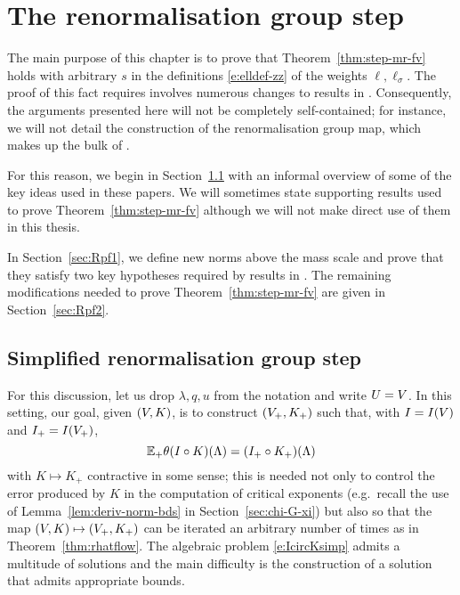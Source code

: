 \chapter{The renormalisation group step}
\label{sec:RGstep}

\renewcommand{\Vpt}{\Vp_\pt}

The main purpose of this chapter is to prove that Theorem~\ref{thm:step-mr-fv}
holds with arbitrary $s$ in the definitions \eqref{e:elldef-zz} of the weights
$\ell, \ell_\sigma$. The proof of this fact requires involves numerous changes
to results in \cite{BS-rg-loc,BS-rg-IE,BS-rg-step}.
Consequently, the arguments presented here will not be completely self-contained;
for instance, we will not detail the construction of the renormalisation group
map, which makes up the bulk of \cite{BS-rg-step}.

For this reason, we begin in Section~\ref{sec:rgmech} with an informal overview
of some of the key ideas used in these papers. We will sometimes state supporting
results used to prove Theorem~\ref{thm:step-mr-fv} although we will not make direct
use of them in this thesis.

In Section~\ref{sec:Rpf1}, we define new norms above the mass scale and  prove
that they satisfy two key hypotheses required by results in \cite{BS-rg-IE}.
The remaining modifications needed to prove Theorem~\ref{thm:step-mr-fv} are
given in Section~\ref{sec:Rpf2}.


\section{Simplified renormalisation group step}
\label{sec:rgmech}

For this discussion, let us drop $\lambda, q, u$ from the notation and write
$U = V$. In this setting, our goal, given $(V, K)$, is to construct
$(V_+, K_+)$ such that, with $I = I(V)$ and $I_+ = I(V_+)$,
\begin{equation}
\label{e:IcircKsimp}
\mathbb{E}_+ \theta (I \circ K)(\Lambda) = (I_+ \circ K_+)(\Lambda)
\end{equation}
with $K \mapsto K_+$ contractive in some sense; this is needed not only to
control the error produced by $K$ in the computation of critical exponents
(e.g.\ recall the use of Lemma~\ref{lem:deriv-norm-bds} in Section~\ref{sec:chi-G-xi})
but also so that the map
$(V, K) \mapsto (V_+, K_+)$ can be iterated an arbitrary number of times as in
Theorem~\ref{thm:rhatflow}. The algebraic problem \eqref{e:IcircKsimp} admits
a multitude of solutions and the main difficulty is the construction of a
solution that admits appropriate bounds.

